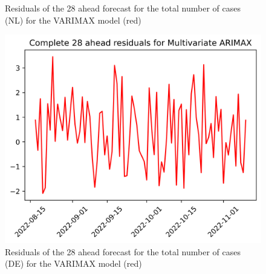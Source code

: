 \begin{figure}
\begin{minipage}{.32\textwidth}
  \caption{Residuals of the 28 ahead forecast for the total number of cases (NL) for the VARIMAX model (red)}
  \label{fig:tot_cases_error_28_VARIMAX}
\end{minipage}
\begin{minipage}{.32\textwidth}
  \centering
  \includegraphics[width=\linewidth]{pics/28_ah/DE_28_ahead_errors_Multivariate ARIMAX.png}
  \caption{Residuals of the 28 ahead forecast for the total number of cases (DE) for the VARIMAX model (red)}
  \label{fig:tot_cases_error_28_VARIMAX_DE}
\end{minipage}

\end{figure}
